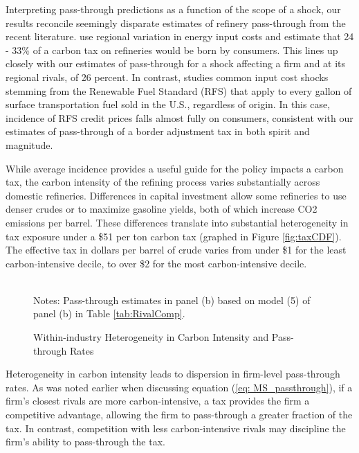 \documentclass[12pt]{article}
\newcommand{\figpath}{../output/offline/figures}
\begin{document}
Interpreting pass-through predictions as a function of the scope of a shock, our results reconcile seemingly disparate estimates of refinery pass-through from the recent literature. \citet{ganapati_incidence_2017} use regional variation in energy input costs and estimate that 24 - 33\% of a carbon tax on refineries would be born by consumers.  This lines up closely with our estimates of pass-through for a shock affecting a firm and at its regional rivals, of 26 percent.  In contrast, \citet{knittel_pass-through_2017} studies common input cost shocks stemming from the Renewable Fuel Standard (RFS) that apply to every gallon of surface transportation fuel sold in the U.S., regardless of origin. In this case, incidence of RFS credit prices falls almost fully on consumers, consistent with our estimates of pass-through of a border adjustment tax in both spirit and magnitude.

While average incidence provides a useful guide for the policy impacts a carbon tax, the carbon intensity of the refining process varies substantially across domestic refineries.  Differences in capital investment allow some refineries to use denser crudes or to maximize gasoline yields, both of which increase CO2 emissions per barrel. These differences translate into substantial heterogeneity in tax exposure under a \$51 per ton carbon tax (graphed in Figure \ref{fig:taxCDF}).  The effective tax in dollars per barrel of crude varies from under \$1 for the least carbon-intensive decile, to over \$2 for the most carbon-intensive decile.

\begin{figure}%
  \centering
  \caption{Within-industry Heterogeneity in Carbon Intensity and Pass-through Rates \label{fig:TaxCDF_Incidence}}
  \hspace{5pt}%
   \\
  \doublespacing
  Notes: Pass-through estimates in panel (b) based on model (5) of panel (b) in Table \ref{tab:RivalComp}.
\end{figure}

Heterogeneity in carbon intensity leads to dispersion in firm-level pass-through rates.  As was noted earlier when discussing equation (\ref{eq: MS_passthrough}), if a firm's closest rivals are more carbon-intensive, a tax provides the firm a competitive advantage, allowing the firm to pass-through a greater fraction of the tax.  In contrast, competition with less carbon-intensive rivals may discipline the firm's ability to pass-through the tax.
\end{document}
